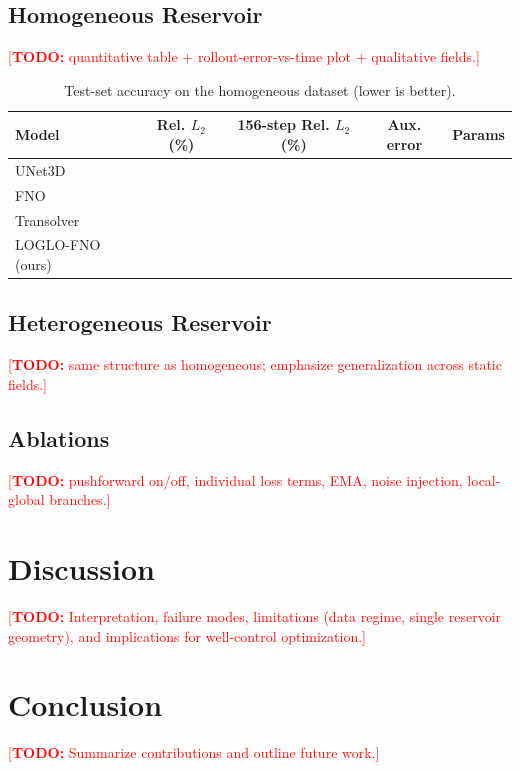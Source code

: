 \documentclass[pdflatex,sn-mathphys-ay]{sn-jnl}
\newcommand{\todo}[1]{\textcolor{red}{[\textbf{TODO:} #1]}}
\begin{document}
\subsection{Homogeneous Reservoir}
\label{sec:results-homo}
\todo{quantitative table + rollout-error-vs-time plot + qualitative fields.}

\begin{table}[t]
  \centering
  \caption{Test-set accuracy on the homogeneous dataset (lower is better).}
  \label{tab:results-homo}
  \begin{tabular}{lcccc}
    \toprule
    Model & Rel. $L_2$ (\%) & 156-step Rel. $L_2$ (\%) & Aux. error & Params \\
    \midrule
    UNet3D     & & & & \\
    FNO        & & & & \\
    Transolver & & & & \\
    LOGLO-FNO (ours) & & & & \\
    \bottomrule
  \end{tabular}
\end{table}

\subsection{Heterogeneous Reservoir}
\label{sec:results-hetero}
\todo{same structure as homogeneous; emphasize generalization across static
fields.}

\subsection{Ablations}
\label{sec:ablations}
\todo{pushforward on/off, individual loss terms, EMA, noise injection,
local-global branches.}

\section{Discussion}
\label{sec:discussion}
\todo{Interpretation, failure modes, limitations (data regime, single reservoir
geometry), and implications for well-control optimization.}

\section{Conclusion}
\label{sec:conclusion}
\todo{Summarize contributions and outline future work.}
\end{document}
